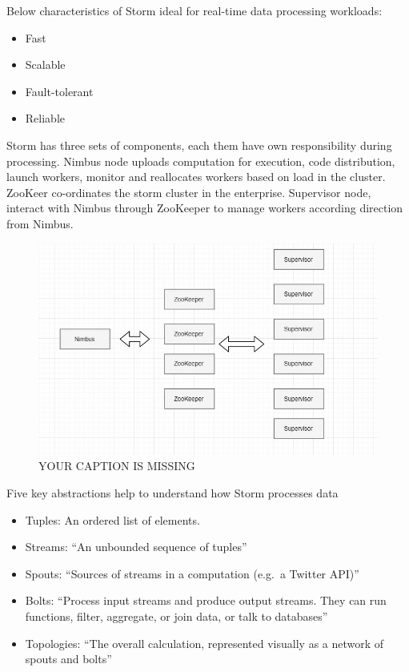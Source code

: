 Below characteristics of Storm ideal for real-time data processing workloads:

\begin{itemize}
\item Fast
\item Scalable
\item Fault-tolerant
\item Reliable
\end{itemize}
 
Storm has three sets of components, each them have own responsibility
during processing. Nimbus node uploads computation for execution, code
distribution, launch workers, monitor and reallocates workers based on
load in the cluster.  ZooKeer co-ordinates the storm cluster in the
enterprise. Supervisor node, interact with Nimbus through ZooKeeper to
manage workers according direction from Nimbus.

\begin{figure}[!ht]
\centering\includegraphics[width=\columnwidth]{images/Storm1.JPG}
  \caption{YOUR CAPTION IS MISSING}\label{f:storm}
\end{figure}

  
Five key abstractions help to understand how Storm processes data

\begin{itemize}
\item Tuples: An ordered list of elements.
\item Streams: ``An unbounded sequence of
  tuples''~\cite{hid-sp18-514-hwp}
\item Spouts: ``Sources of streams in a computation (e.g.\ a Twitter
  API)''~\cite{hid-sp18-514-hwp}
\item Bolts: ``Process input streams and produce output streams. They
  can run functions, filter, aggregate, or join data, or talk to
  databases''~\cite{hid-sp18-514-hwp}
\item Topologies: ``The overall calculation, represented visually as a
  network of spouts and bolts''~\cite{hid-sp18-514-hwp}
\end{itemize}

